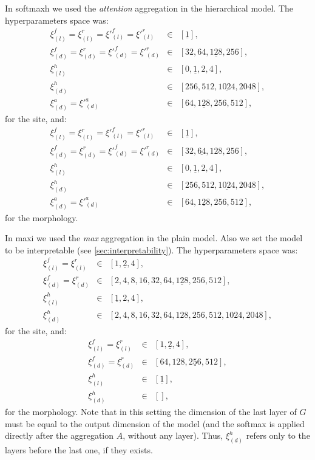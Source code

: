 In \ac{softmaxh} we used the \emph{attention} aggregation in the
hierarchical model. The hyperparameters space was:
\begin{align*}
  \xi_{(l)}^f=\xi_{(l)}^r=\xi'^f_{(l)}=\xi'^r_{(l)}&\in&[\underline{1}],\\
  \xi_{(d)}^f=\xi_{(d)}^r=\xi'^f_{(d)}=\xi'^r_{(d)}&\in&[32,64,\underline{128},256],\\
  \xi_{(l)}^h&\in&[0,\underline{1},2,4],\\
  \xi_{(d)}^h&\in&[256,512,\underline{1024},2048],\\
  \xi_{(d)}^a=\xi'^a_{(d)}&\in&[64,\underline{128},256,512],
\end{align*}
for the site, and:
\begin{align*}
  \xi_{(l)}^f=\xi_{(l)}^r=\xi'^f_{(l)}=\xi'^r_{(l)}&\in&[\underline{1}],\\
  \xi_{(d)}^f=\xi_{(d)}^r=\xi'^f_{(d)}=\xi'^r_{(d)}&\in&[32,\underline{64},128,256],\\
  \xi_{(l)}^h&\in&[0,\underline{1},2,4],\\
  \xi_{(d)}^h&\in&[256,512,\underline{1024},2048],\\
  \xi_{(d)}^a=\xi'^a_{(d)}&\in&[64,\underline{128},256,512],
\end{align*}
for the morphology.

In \ac{maxi} we used the \emph{max} aggregation in the plain
model. Also we set the model to be interpretable (see
\cref{sec:interpretability}). The hyperparameters space was:
\begin{align*}
  \xi_{(l)}^f=\xi_{(l)}^r&\in&[1,\underline{2},4],\\
  \xi_{(d)}^f=\xi_{(d)}^r&\in&[2,4,8,16,32,64,\underline{128},256,512],\\
  \xi_{(l)}^h&\in&[\underline{1},2,4],\\
  \xi_{(d)}^h&\in&[2,4,8,16,32,64,128,256,512,1024,2048],
\end{align*}
for the site, and:
\begin{align*}
  \xi_{(l)}^f=\xi_{(l)}^r&\in&[1,\underline{2},4],\\
  \xi_{(d)}^f=\xi_{(d)}^r&\in&[64,128,\underline{256},512],\\
  \xi_{(l)}^h&\in&[\underline{1}],\\
  \xi_{(d)}^h&\in&[],
\end{align*}
for the morphology. Note that in this setting the dimension of the
last layer of $G$ must be equal to the output dimension of the model
(and the softmax is applied directly after the aggregation $A$,
without any layer). Thus, $\xi_{(d)}^h$ refers only to the
layers before the last one, if they exists.




